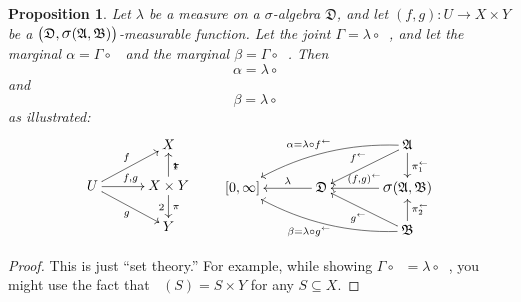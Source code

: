 \documentclass[
twoside=true,
paper=letter,
fontsize=9pt,
pagesize=auto,
leqno,
openany,
headsepline,
overfullrule,
]{scrbook}
\theoremstyle{plain}
\theoremstyle{plain}
\newtheorem{prop}[thm]{Proposition}
\theoremstyle{definition}
\theoremstyle{bfnoteitalic}
\theoremstyle{bfnoteroman}
\newcommand{\sigalg}[1]{\mathfrak{#1}}
\newcommand{\sagb}{\mathop{\hbox{\large{$\sigma$}}}\nolimits}
\newcommand{\textsigma}{\hbox{\large{$\sigma$}}\kern-1pt}
\newcommand{\preimage}[1]{\mathop{#1^{\leftarrow}}}
\newcommand{\sigmaalgebra}{\sigalg{A}}
\newcommand{\sigmaalgebraii}{\sigalg{B}}
\newcommand{\productsig}[2]{\sagb(#1,#2)}
\newcommand{\funcf}{f}
\newcommand{\funcg}{g}
\newcommand{\measurespace}{X}
\newcommand{\measurespaceii}{Y}
\newcommand{\measlambda}{\lambda}
\newcommand{\projectionone}{\pi_1}
\newcommand{\projectiontwo}{\pi_2}
\newcommand{\uspace}{U}%
\newcommand{\uspacesig}{\sigalg{D}}
\newcommand{\measonprod}{\Gamma}%
\newcommand{\marginalone}{\alpha}%
\newcommand{\marginaltwo}{\beta}%
\begin{document}
\begin{prop}\label{induced_marginals}
Let $\measlambda$ be a measure on a \textsigma-algebra
$\uspacesig$,
and let
$(\funcf,\funcg):\uspace\to \measurespace  \times \measurespaceii $
be a
$\bigl(\uspacesig,\productsig{\sigmaalgebra}{\sigmaalgebraii}\bigr)$\hyp{}measurable
function.
Let the joint
$\measonprod
=
\measlambda\circ\preimage{(\funcf,\funcg)}$,
and let the marginal
$\marginalone
=
\measonprod\circ\preimage{\projectionone}$
and the marginal
$\marginaltwo
=
\measonprod\circ\preimage{\projectiontwo}$.
Then
\[
\marginalone
=
\measlambda\circ\preimage{\funcf}
\]
and
\[
\marginaltwo
=
\measlambda\circ\preimage{\funcg}
\]
as illustrated:
\[
\xymatrix@R=16pt@C=30pt{
 & \measurespace
 \\
 \uspace
 \ar[ur]^{\funcf}
 \ar[dr]_{\funcg}
 \ar[r]^{\funcf, \funcg} &
 \measurespace \times \measurespaceii  \ar[u]_\projectionone \ar[d]^\projectiontwo
 \\
 & \measurespaceii  \\
}
\qquad
\xymatrix@R=16pt@C=34pt{
 & & \sigmaalgebra
 \ar[dl]_{\preimage{\funcf}}
 \ar[d]^{\preimage{\projectionone}}
 \ar@/_10pt/[lld]_{\makebox[0pt][r]{$\scriptstyle{\marginalone} = $}\measlambda\circ\preimage{\funcf}}
 \\
 [0,\infty] & \uspacesig \ar[l]_-{\measlambda} &
 \productsig{\sigmaalgebra}{\sigmaalgebraii}
 \ar[l]_{\preimage{(\funcf,\funcg)}}
 \\
 & & \sigmaalgebraii
  \ar[u]_{\preimage{\projectiontwo}}
  \ar[ul]^{\preimage{\funcg}}
  \ar@/^10pt/[llu]^{\makebox[0pt][r]{$\scriptstyle{\marginaltwo} = $}\measlambda\circ\preimage{\funcg}}
  \\
}
\]
\end{prop}

\begin{proof}
This is just ``set theory.''  For example, while showing
$\measonprod \circ \preimage{\projectionone}
=
\measlambda\circ\preimage{\funcf}$,
you might use the fact that
$\preimage{\projectionone}(S) = S\times \measurespaceii $ for any $S\subseteq \measurespace $.
\end{proof}
\end{document}
